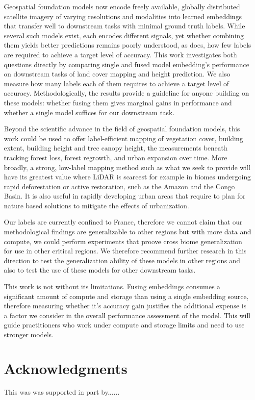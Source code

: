 \documentclass{article}
\begin{document}
Geospatial foundation models now encode freely available, globally distributed satellite imagery of varying resolutions and modalities into learned embeddings that transfer well to downstream tasks with minimal ground truth labels. 
While several such models exist, each encodes different signals, yet whether combining them yields better predictions remains poorly understood, as does, how few labels are required to achieve a target level of accuracy.
This work investigates both questions directly by comparing single and fused model embedding's performance on downstream tasks of land cover mapping and height prediction. 
We also measure how many labels each of them requires to achieve a target level of accuracy.
Methodologically, the results provide a guideline for anyone building on these models: whether fusing them gives marginal gains in performance and whether a single model suffices for our downstream task. 

Beyond the scientific advance in the field of geospatial foundation models, this work could be used to offer label-efficient mapping of vegetation cover, building extent, building height and tree canopy height, the measurements beneath tracking forest loss, forest regrowth, and urban expansion over time.
More broadly, a strong, low-label mapping method such as what we seek to provide will have its greatest value where LiDAR is scarcest for example in biomes undergoing rapid deforestation or active restoration, such as the Amazon and the Congo Basin. It is also useful in rapidly developing urban areas that require to plan for nature based solutions to mitigate the effects of urbanization.

Our labels are currently confined to France, therefore we cannot claim that our methodological findings are generalizable to other regions but with more data and compute, we could perform experiments that proove cross biome generalization for use in other critical regions. 
We therefore recommend further research in this direction to test the generalization ability of these models in other regions and also to test the use of these models for other downstream tasks.

This work is not without its limitations. Fusing embeddings consumes a significant amount of compute and storage than using a single embedding source, therefore measuring whether it's accuracy gain justifies the additional expense is a factor we consider in the overall performance assessment of the model.
This will guide practitioners who work under compute and storage limits and need to use stronger models.


\section*{Acknowledgments}
This was was supported in part by......

  
  
\end{document}
